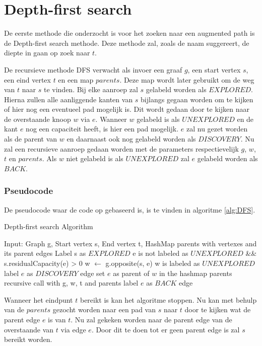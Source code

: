 \chapter{Depth-first search}
\label{chap:depthfirst}

De eerste methode die onderzocht is voor het zoeken naar een augmented path is de Depth-first search methode. Deze methode zal, zoals de naam suggereert, de diepte in gaan op zoek naar $t$. 

De recursieve methode DFS verwacht als invoer een graaf $g$, een start vertex $s$, een eind vertex $t$ en een map $parents$. Deze map wordt later gebruikt om de weg van $t$ naar $s$ te vinden. Bij elke aanroep zal $s$ gelabeld worden als $EXPLORED$. Hierna zullen alle aanliggende kanten van $s$ bijlangs gegaan worden om te kijken of hier nog een eventueel pad mogelijk is. Dit wordt gedaan door te kijken naar de overstaande knoop $w$ via $e$. Wanneer $w$ gelabeld is als $UNEXPLORED$ en de kant $e$ nog een capaciteit heeft, is hier een pad mogelijk. $e$ zal nu gezet worden als de parent van $w$ en daarnaast ook nog gelabeld worden als $DISCOVERY$. Nu zal een recursieve aanroep gedaan worden met de parameters respectievelijk $g$, $w$, $t$ en $parents$.
Als $w$ niet gelabeld is als $UNEXPLORED$ zal $e$ gelabeld worden als $BACK$.

\subsection{Pseudocode}
De pseudocode waar de code op gebaseerd is, is te vinden in algoritme \ref{alg:DFS}.

\begin{algorithm}[h]
\caption{Depth-first search Algorithm}
\label{alg:DFS}
\begin{algorithmic}
\REQUIRE Input: Graph g, Start vertex s, End vertex t, HashMap parents with vertexes and its parent edges
\STATE Label s as $EXPLORED$
\IF e is not labeled as $UNEXPLORED$ && s.residualCapacity(e) > 0
\STATE w $\gets $ g.opposite(s, e)
\IF w is labeled as $UNEXPLORED$
\STATE label $e$ as $DISCOVERY$ edge
\STATE set $e$ as parent of $w$ in the hashmap parents
\STATE recursive call with g, w, t and parents
\ELSE
\STATE label $e$ as $BACK$ edge
\ENDIF
\ENDIF
\ENDFOR
\end{algorithmic}
\end{algorithm}

Wanneer het eindpunt $t$ bereikt is kan het algoritme stoppen. Nu kan met behulp van de $parents$ gezocht worden naar een pad van $s$ naar $t$ door te kijken wat de parent edge $e$ is van $t$. Nu zal gekeken worden naar de parent edge van de overstaande van $t$ via edge $e$. Door dit te doen tot er geen parent edge is zal $s$ bereikt worden.